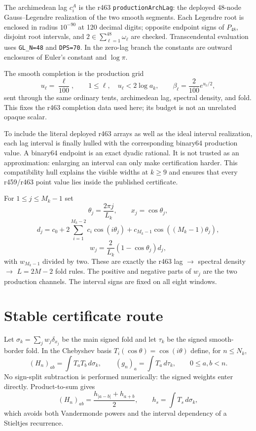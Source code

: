 \documentclass[11pt]{article}
\theoremstyle{remark}
\begin{document}
The archimedean lag $c_i^A$ is the r463
\texttt{productionArchLag}: the deployed 48-node Gauss--Legendre
realization of the two smooth segments.  Each Legendre root is enclosed
in radius $10^{-90}$ at 120 decimal digits; opposite endpoint signs of
$P_{48}$, disjoint root intervals, and
$2\in\sum_{\ell=1}^{48}\omega_\ell$ are checked.  Transcendental
evaluation uses \texttt{GL\_N=48} and \texttt{DPS=70}.  In the zero-lag branch the
constants are outward enclosures of Euler's constant and $\log\pi$.

The smooth completion is the production grid
\[
 u_\ell=\frac{\ell}{100},\qquad
 1\le\ell,\quad u_\ell<2\log a_k,\qquad
 \beta_\ell=\frac{2}{100}e^{u_\ell/2},
\]
sent through the same ordinary tents, archimedean lag, spectral
density, and fold.  This fixes the r463 completion data used here; its
budget is not an unrelated opaque scalar.

To include the literal deployed r463 arrays as well as the ideal
interval realization, each lag interval is finally hulled with the
corresponding binary64 production value.  A binary64 endpoint is an
exact dyadic rational.  It is not trusted as an approximation:
enlarging an interval can only make certification harder.  This
compatibility hull explains the visible widths at $k\ge9$ and ensures
that every r459/r463 point value lies inside the published certificate.

For $1\le j\le M_k-1$ set
\[
 \theta_j=\frac{2\pi j}{L_k},\qquad x_j=\cos\theta_j,
\]
\[
 d_j=c_0+2\sum_{i=1}^{M_k-2}c_i\cos(i\theta_j)
          +c_{M_k-1}\cos((M_k-1)\theta_j),
\]
\[
 w_j=\frac{2}{L_k}(1-\cos\theta_j)d_j ,
\]
with $w_{M_k-1}$ divided by two.  These are exactly the r463
lag $\to$ spectral density $\to$ $L=2M-2$ fold rules.
The positive and negative parts of $w_j$ are the two production
channels.  The interval signs are fixed on all eight windows.

\section{Stable certificate route}

Let $\sigma_k=\sum_jw_j\delta_{x_j}$ be the main signed fold and let
$\tau_k$ be the signed smooth-border fold.  In the Chebyshev basis
$T_i(\cos\theta)=\cos(i\theta)$ define, for $n\le N_k$,
\[
 (H_n)_{ab}=\int T_aT_b\,d\sigma_k,\qquad
 (g_n)_a=\int T_a\,d\tau_k,\qquad 0\le a,b<n.
\]
No sign-split subtraction is performed numerically: the signed
weights enter directly.  Product-to-sum gives
\[
 (H_n)_{ab}=\frac{h_{|a-b|}+h_{a+b}}2,\qquad
 h_s=\int T_s\,d\sigma_k ,
\]
which avoids both Vandermonde powers and the interval dependency of a
Stieltjes recurrence.
\end{document}

